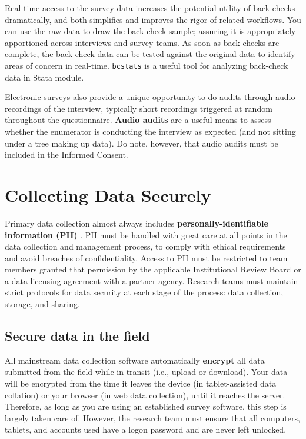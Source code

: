 Real-time access to the survey data increases the potential utility of
back-checks dramatically, and both simplifies and improves the rigor of related
workflows.
You can use the raw data to draw the back-check sample; assuring it is
appropriately apportioned across interviews and survey teams.
As soon as back-checks are complete, the back-check data can be tested against
the original data to identify areas of concern in real-time.
\texttt{bcstats} is a useful tool for analyzing back-check data in Stata module.

Electronic surveys also provide a unique opportunity to do audits through audio recordings of the interview,
typically short recordings triggered at random throughout the questionnaire.
\textbf{Audio audits} are a useful means to assess whether the enumerator is conducting the interview
as expected (and not sitting under a tree making up data).
Do note, however, that audio audits must be included in the Informed Consent.


\section{Collecting Data Securely}
Primary data collection almost always includes  \textbf{personally-identifiable information (PII)}
.
PII must be handled with great care at all points in the data collection and management process, to comply with ethical requirements and avoid breaches of confidentiality. Access to PII must be restricted to team members granted that permission by the applicable Institutional Review Board or a data licensing agreement with a partner agency. Research teams must maintain strict protocols for data security at each stage of the process: data collection, storage, and sharing.

\subsection{Secure data in the field}
All mainstream data collection software automatically \textbf{encrypt}
all data submitted from the field while in transit (i.e., upload or download).  Your data will be encrypted from the time it leaves the device (in tablet-assisted data collation) or your browser (in web data collection), until it reaches the server. Therefore, as long as you are using an established survey software, this step is largely taken care of. However, the research team must ensure that all computers, tablets, and accounts used have a logon password and are never left unlocked.

